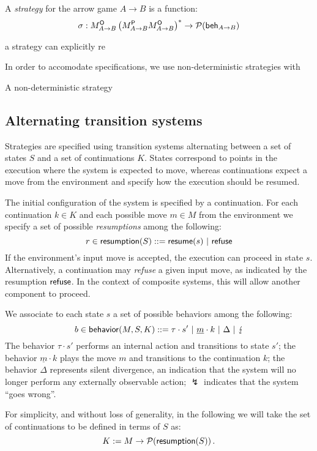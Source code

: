 \begin{definition}
A \emph{strategy} for the arrow game $A \rightarrow B$
is a function:
\[
    \sigma :
      M_{A \rightarrow B}^{ \mathsf{O} }
      \left( M_{A \rightarrow B}^{ \mathsf{P} } M_{A \rightarrow B}^{ \mathsf{O} } \right)^*
      \rightarrow
      \mathcal{P}( \mathsf{beh} _{A \rightarrow B})
\]
\end{definition}


a strategy can explicitly re


In order to accomodate specifications,
we use non-deterministic strategies with 

A non-deterministic strategy 


\subsection{Alternating transition systems}

Strategies are specified using transition systems
alternating between a set of states $S$ and
a set of continuations $K$.
States correspond to points in the execution
where the system is expected to move,
whereas continuations expect a move from the environment
and specify how the execution should be resumed.

The initial configuration of the system
is specified by a continuation.
For each continuation $k \in K$
and each possible move $m \in M$ from the environment
we specify a set of possible \emph{resumptions}
among the following:
\[ r \in  \mathsf{resumption} (S) ::=
	 \mathsf{resume} (s) \ |\  \mathsf{refuse}  \]
If the environment's input move is accepted,
the execution can proceed in state $s$.
Alternatively,
a continuation may \emph{refuse} a given input move,
as indicated by the resumption $ \mathsf{refuse} $.
In the context of composite systems,
this will allow another component to proceed.

We associate to each state $s$ a set of possible
behaviors among the following:
\[ b \in \kw{behavior}(M,S,K) ::=
	\tau \cdot s' \ |\
	\underline{m} \cdot k \ | \
	\Delta \ |\ 
	\lightning \]
The behavior $\tau \cdot s'$
performs an internal action and transitions to state $s'$;
the behavior $\underline{m} \cdot k$
plays the move $m$ and transitions to the continuation $k$;
the behavior $\Delta$ represents silent divergence,
an indication that the system will no longer perform
any externally observable action;
$\lightning$ indicates that the system ``goes wrong''.

For simplicity, and without loss of generality,
in the following we will take the set of continuations
to be defined in terms of $S$ as:
\[ K := M \rightarrow \mathcal{P}( \mathsf{resumption} (S)) \,. \]

